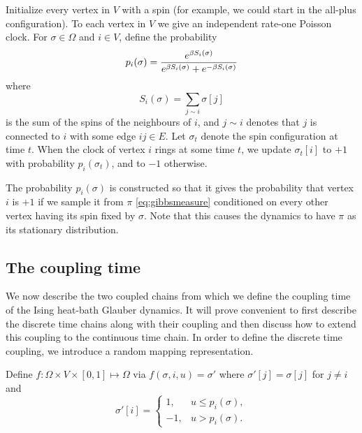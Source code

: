 	Initialize every vertex in $V$ with a spin (for example, we could start in the all-plus configuration). To each vertex in $V$ we give an independent rate-one Poisson clock. For $\sigma \in \Omega$ and $i \in V$, define the probability 
	\begin{equation}
		p_i(\sigma) = \frac{e^{\beta S_i(\sigma)}}{e^{\beta S_i(\sigma)} + e^{-\beta S_i(\sigma)}}
		\label{eq:define p_i}
	\end{equation}
	where
	\begin{equation}
		S_i(\sigma) = \sum_{j \sim i} \sigma[j]
	\end{equation}
	is the sum of the spins of the neighbours of $i$, and $j \sim i$ denotes that $j$ is connected to $i$ with some edge $ij \in E$. Let $\sigma_t$ denote the spin configuration at time $t$. When the clock of vertex $i$ rings at some time $t$, we update $\sigma_t[i]$ to $+1$ with probability $p_i(\sigma_t)$, and to $-1$ otherwise.

	The probability $p_i(\sigma)$ is constructed so that it gives the probability that vertex $i$ is $+1$ if we sample it from $\pi$ \eqref{eq:gibbsmeasure} conditioned on every other vertex having its spin fixed by $\sigma$. Note that this causes the dynamics to have $\pi$ as its stationary distribution.

	\subsection{The coupling time}
	\label{sec:the coupling time}

	We now describe the two coupled chains from which we define the coupling time of the Ising heat-bath Glauber dynamics. It will prove convenient to first describe the discrete time chains along with their coupling and then discuss how to extend this coupling to the continuous time chain.	In order to define the discrete time coupling, we introduce a random mapping representation.

	Define $f: \Omega \times V \times [0,1] \mapsto \Omega$ via $f(\sigma, i, u) = \sigma'$ where $\sigma'[j] = \sigma[j]$ for $j \neq i$ and
	\begin{equation}
		\sigma'[i] = 
			\begin{cases}
				1, &u \leq p_i(\sigma),\\
				-1, &u > p_i(\sigma).
			\end{cases}
		\label{eq:plusorminusrules}
	\end{equation}

